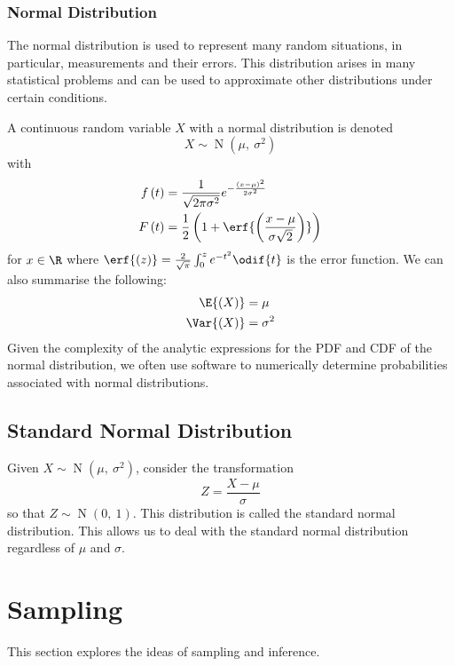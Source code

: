 \documentclass{article}
\begin{document}
\subsubsection{Normal Distribution}
The normal distribution is used to represent many random situations, in particular, measurements and their errors.
This distribution arises in many statistical problems and can be used to \linebreak approximate other distributions
under certain conditions.

A continuous random variable \(X\) with a normal distribution is denoted
\begin{equation*}
    X \sim \operatorname{N}{\left( \mu,\: \sigma^2 \right)}
\end{equation*}
with
\begin{align*}
    f\left( t \right) & = \frac{1}{\sqrt{2 \pi \sigma^2}} e^{-\frac{\left( x - \mu \right)^2}{2 \sigma^2}}    \\
    F\left( t \right) & = \frac{1}{2} \left( 1 + \erf{\left( \frac{x - \mu}{\sigma \sqrt{2}} \right)} \right)
\end{align*}
for \(x \in \R\) where \(\erf{\left( z \right)} = \frac{2}{\sqrt{\pi}} \int_0^z e^{-t^2} \odif{t}\) is the error function.
We can also summarise the following:
\begin{align*}
    \E{\left( X \right)}   & = \mu      \\
    \Var{\left( X \right)} & = \sigma^2
\end{align*}
Given the complexity of the analytic expressions for the PDF and CDF of the normal distribution, we often
use software to numerically determine probabilities associated with normal distributions.
\subsection{Standard Normal Distribution}
Given \(X \sim \operatorname{N}{\left( \mu,\: \sigma^2 \right)}\), consider the transformation
\begin{equation*}
    Z = \frac{X - \mu}{\sigma}
\end{equation*}
so that \(Z \sim \operatorname{N}{\left( 0,\: 1 \right)}\). This distribution is called the standard normal distribution.
This allows us to deal with the standard normal distribution regardless of \(\mu\) and \(\sigma\).
\section{Sampling}
This section explores the ideas of sampling and inference.
\end{document}
